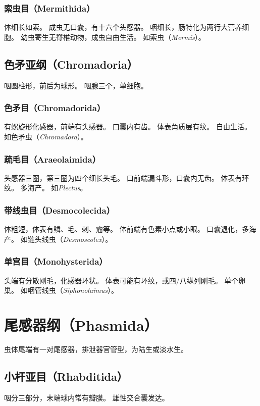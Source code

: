 \documentclass[11pt]{article}
\begin{document}
\subsubsection{索虫目（Mermithida）}
体细长如索。
成虫无口囊，有十六个头感器。
咽细长，肠特化为两行大营养细胞。
幼虫寄生无脊椎动物，成虫自由生活。
如索虫（\textit{Mermis}）。

\subsection{色矛亚纲（Chromadoria）}
咽圆柱形，前后为球形。
咽腺三个，单细胞。

\subsubsection{色矛目（Chromadorida）}
有螺旋形化感器，前端有头感器。
口囊内有齿。
体表角质层有纹。
自由生活。
如色矛虫（\textit{Chromadora}）。

\subsubsection{疏毛目（Araeolaimida）}
头感器三圈，第三圈为四个细长头毛。
口前端漏斗形，口囊内无齿。
体表有环纹。
多海产。
如\textit{Plectus}。

\subsubsection{带线虫目（Desmocolecida）}
体粗短，体表有鳞、毛、刺、瘤等。
体前端有色素小点或小眼。
口囊退化，多海产。
如链头线虫（\textit{Desmoscolex}）。

\subsubsection{单宫目（Monohysterida）}
头端有分散刚毛，化感器环状。
体表可能有环纹，或四/八纵列刚毛。
单个卵巢。
如咽管线虫（\textit{Siphonolaimus}）。

\section{尾感器纲（Phasmida）}
虫体尾端有一对尾感器，排泄器官管型，为陆生或淡水生。

\subsection{小杆亚目（Rhabditida）}
咽分三部分，末端球内常有瓣膜。
雄性交合囊发达。
\end{document}
